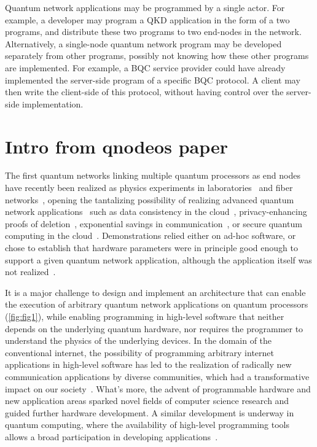 Quantum network applications may be programmed by a single actor.
For example, a developer may program a QKD application in the form of a two programs, and distribute these two programs to two end-nodes in the network.
Alternatively, a single-node quantum network program may be developed separately from other programs, possibly not knowing how these other programs are implemented.
For example, a BQC service provider could have already implemented the server-side program of a specific BQC protocol.
A client may then write the client-side of this protocol, without having control over the server-side implementation.




\section{Intro from qnodeos paper}
The first quantum networks linking multiple quantum processors as end nodes have recently been realized as physics experiments in laboratories~\cite{moehring_2007_ion_traps,ritter_2012_elementary,hofmann_2012_heralded,stockill_2017_phasetuned,jing2019entanglement,stephenson_2020_highrate,pompili_2021_multinode,krutyanskiy_entanglement_2023} and fiber networks~\cite{liu2024creation,stolk2024metropolitan,knaut2024entanglement}, opening the tantalizing possibility of realizing advanced quantum network applications~\cite{wehner_2018_stages} such as data consistency in the cloud~\cite{benor_2005_byzantine}, privacy-enhancing proofs of deletion~\cite{poremba_quantum_2022}, exponential savings in communication~\cite{guerin_exponential_2016}, or secure quantum computing in the cloud~\cite{broadbent_2009_ubqc,childs_2005_secure_qc}. Demonstrations relied either on ad-hoc software, or chose to establish that hardware parameters were in principle good enough to support a given quantum network application, although the application itself was not realized~\cite{nadlinger_device-independent_2022,liu_2022_photonic_diqkd,zhang_2022_diqkd}.

It is a major challenge to design and implement an architecture that can enable the execution of arbitrary quantum network applications on quantum processors (\cref{fig:fig1}), while enabling programming in high-level software that neither depends on the underlying quantum hardware, nor requires the programmer to understand the physics of the underlying devices.  In the domain of the conventional internet, the possibility of programming arbitrary internet applications in high-level software has led to the realization of radically new communication applications by diverse communities, which had a transformative impact on our society~\cite{castells_impact_2013}. What's more, the advent of programmable hardware and new application areas sparked novel fields of computer science research and guided further hardware development.  A similar development is underway in quantum computing, where the availability of high-level programming tools allows a broad participation in developing applications~\cite{noauthor_quantum_2024}.




